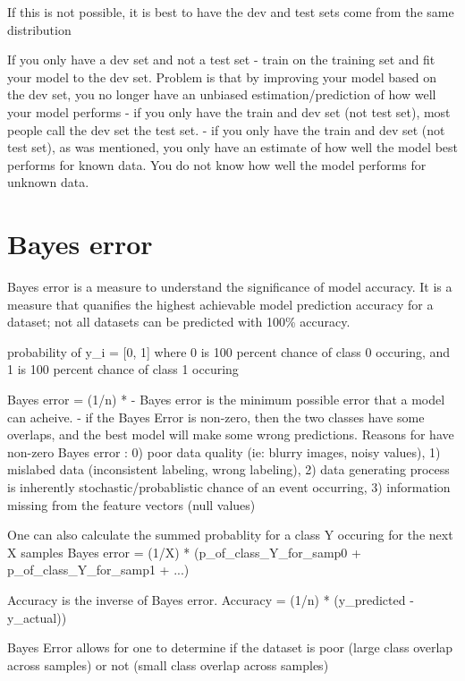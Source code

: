 \documentclass[11pt, onecolumn]{article}
\begin{document}
If this is not possible, it is best to have the dev and test sets come from the same distribution

If you only have a dev set and not a test set - train on the training set and fit your model to the dev set. Problem is that by improving your model based on the dev set, you no longer have an unbiased estimation/prediction of how well your model performs
	- if you only have the train and dev set (not test set), most people call the dev set the test set.
	- if you only have the train and dev set (not test set), as was mentioned, you only have an estimate of how well the model best performs for known data. You do not know how well the model performs for unknown data.
	






\section{Bayes error}

Bayes error is a measure to understand the significance of model accuracy. It is a measure that quanifies the highest achievable model prediction accuracy for a dataset; not all datasets can be predicted with 100\% accuracy.

probability of y_i = [0, 1] where 0 is 100 percent chance of class 0 occuring, and 1 is 100 percent chance of class 1 occuring

Bayes error = (1/n) * 
	- Bayes error is the minimum possible error that a model can acheive. 
	- if the Bayes Error is non-zero, then the two classes have some overlaps, and the best model will make some wrong predictions. Reasons for have non-zero Bayes error : 0) poor data quality (ie: blurry images, noisy values),  1) mislabed data (inconsistent labeling, wrong labeling), 2) data generating process is inherently stochastic/probablistic chance of an event occurring, 3) information missing from the feature vectors (null values)
	

One can also calculate the summed probablity for a class Y occuring for the next X samples
Bayes error = (1/X) * (p_of_class_Y_for_samp0 + p_of_class_Y_for_samp1 + ...)

Accuracy is the inverse of Bayes error.
Accuracy = (1/n) * \sum (y_predicted - y_actual))


Bayes Error allows for one to determine if the dataset is poor (large class overlap across samples) or not (small class overlap across samples)
 
\end{document}
